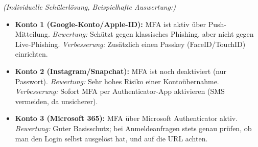 \documentclass[12pt,a4paper]{article}
\begin{document}
\begin{solutionbox}
\textit{(Individuelle Schülerlösung, Beispielhafte Auswertung:)}
\begin{itemize}
    \item \textbf{Konto 1 (Google-Konto/Apple-ID):} MFA ist aktiv über Push-Mitteilung. \textit{Bewertung:} Schützt gegen klassisches Phishing, aber nicht gegen Live-Phishing. \textit{Verbesserung:} Zusätzlich einen Passkey (FaceID/TouchID) einrichten.
    \item \textbf{Konto 2 (Instagram/Snapchat):} MFA ist noch deaktiviert (nur Passwort). \textit{Bewertung:} Sehr hohes Risiko einer Kontoübernahme. \textit{Verbesserung:} Sofort MFA per Authenticator-App aktivieren (SMS vermeiden, da \mbox{unsicherer}).
    \item \textbf{Konto 3 (Microsoft 365):} MFA über Microsoft Authenticator aktiv. \textit{Bewertung:} Guter Basisschutz; bei Anmeldeanfragen stets genau prüfen, ob man den Login selbst ausgelöst hat, und auf die URL achten.
\end{itemize}
\end{solutionbox}

\newpage
\printbibliography[heading=bibintoc, title={Literaturverzeichnis}]

\vspace{1.5cm}
\printglossary[type=\acronymtype, title=Akronyme]

\newpage
\printglossary[title=Glossar]
\end{document}
